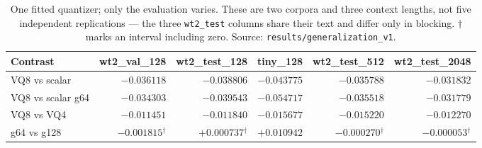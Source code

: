 \begin{table}[t]
\centering
\small
\begin{tabular}{lrrrrr}
\toprule
Contrast & wt2\_val\_128 & wt2\_test\_128 & tiny\_128 & wt2\_test\_512 & wt2\_test\_2048 \\
\midrule
VQ8 vs scalar & $-0.036118$ & $-0.038806$ & $-0.043775$ & $-0.035788$ & $-0.031832$ \\
VQ8 vs scalar g64 & $-0.034303$ & $-0.039543$ & $-0.054717$ & $-0.035518$ & $-0.031779$ \\
VQ8 vs VQ4 & $-0.011451$ & $-0.011840$ & $-0.015677$ & $-0.015220$ & $-0.012270$ \\
g64 vs g128 & $-0.001815$$^{\dagger}$ & $+0.000737$$^{\dagger}$ & $+0.010942$ & $-0.000270$$^{\dagger}$ & $-0.000053$$^{\dagger}$ \\
\bottomrule
\end{tabular}
\caption{One fitted quantizer; only the evaluation varies. These are two corpora and three context lengths, not five independent replications --- the three \texttt{wt2\_test} columns share their text and differ only in blocking. $\dagger$ marks an interval including zero. Source: \texttt{results/generalization\_v1}.}
\label{tab:gen}
\end{table}
